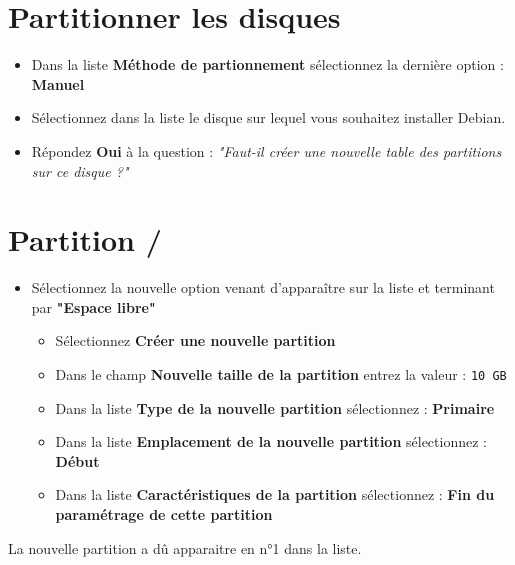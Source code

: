 \section{Partitionner les disques}
\begin{itemize}
	\item Dans la liste \textbf{Méthode de partionnement} sélectionnez la dernière option : \textbf{Manuel}
	\item Sélectionnez dans la liste le disque sur lequel vous souhaitez installer Debian.
	\item Répondez \textbf{Oui} à la question : \textit{"Faut-il créer une nouvelle table des partitions sur ce disque ?"}
\end{itemize}

\section{Partition /}
	\begin{itemize}
	\item Sélectionnez la nouvelle option venant d'apparaître sur la liste et terminant par \textbf{"Espace libre"}
		\begin{itemize}
			\item Sélectionnez \textbf{Créer une nouvelle partition}
			\item Dans le champ \textbf{Nouvelle taille de la partition} entrez la valeur : \texttt{10 GB}
			\item Dans la liste \textbf{Type de la nouvelle partition} sélectionnez : \textbf{Primaire}
			\item Dans la liste \textbf{Emplacement de la nouvelle partition} sélectionnez : \textbf{Début}
			\item Dans la liste \textbf{Caractéristiques de la partition} sélectionnez : \textbf{Fin du paramétrage de cette partition}\\	
		\end{itemize}
	\end{itemize}

La nouvelle partition a dû apparaitre en n°1 dans la liste.
		
